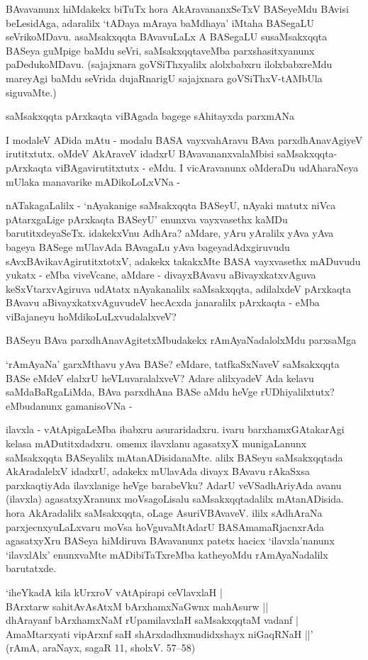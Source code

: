 BAvavanunx hiMdakekx biTuTx hora AkAravananxSeTxV BASeyeMdu BAvisi beLesidAga, adaralilx `tADaya mAraya baMdhaya' iMtaha BASegaLU seVrikoMDavu. asaMsakxqqta BAvavuLaLx A BASegaLU susaMsakxqqta BASeya guMpige baMdu seVri, saMsakxqqtaveMba parxshasitxyanunx paDedukoMDavu. (sajajxnara goVSiThxyalilx alolxbabxru ilolxbabxreMdu mareyAgi baMdu seVrida dujaRnarigU sajajxnara goVSiThxV-tAMbUla siguvaMte.)

saMsakxqqta pArxkaqta viBAgada bagege sAhitayxda parxmANa

I modaleV ADida mAtu - modalu BASA vayxvahAravu BAva parxdhAnavAgiyeV irutitxtutx. oMdeV AkAraveV idadxrU BAvavananxvalaMbisi saMsakxqqta-pArxkaqta viBAgavirutitxtutx - eMdu. I vicAravanunx oMderaDu udAharaNeya mUlaka manavarike mADikoLoLxVNa - 

nATakagaLalilx - `nAyakanige saMsakxqqta BASeyU, nAyaki matutx niVca pAtarxgaLige pArxkaqta BASeyU' enunxva vayxvasethx kaMDu barutitxdeyaSeTx. idakekxVnu AdhAra? aMdare, yAru yAralilx yAva yAva bageya BASege mUlavAda BAvagaLu yAva bageyadAdxgiruvudu sAvxBAvikavAgirutitxtotxV, adakekx takakxMte BASA vayxvasethx mADuvudu yukatx - eMba viveVcane, aMdare - divayxBAvavu aBivayxkatxvAguva keSxVtarxvAgiruva udAtatx nAyakanalilx saMsakxqqta, adilalxdeV pArxkaqta BAvavu aBivayxkatxvAguvudeV hecAcxda janaralilx pArxkaqta - eMba viBajaneyu hoMdikoLuLxvudalalxveV?

BASeyu BAva parxdhAnavAgitetxMbudakekx rAmAyaNadalolxMdu parxsaMga

`rAmAyaNa' garxMthavu yAva BASe? eMdare, tatfkaSxNaveV saMsakxqqta BASe eMdeV elalxrU heVLuvaralalxveV? Adare alilxyadeV Ada kelavu saMdaBaRgaLiMda, BAva parxdhAna BASe aMdu heVge rUDhiyalilxtutx? eMbudanunx gamanisoVNa -

ilavxla - vAtApigaLeMba ibabxru asuraridadxru. ivaru barxhamxGAtakarAgi kelasa mADutitxdadxru. omemx ilavxlanu agasatxyX munigaLanunx saMsakxqqta BASeyalilx mAtanADisidanaMte. alilx BASeyu saMsakxqqtada AkAradalelxV idadxrU, adakekx mUlavAda divayx BAvavu rAkaSxsa parxkaqtiyAda ilavxlanige heVge barabeVku? AdarU veVSadhAriyAda avanu (ilavxla) agasatxyXranunx moVsagoLisalu saMsakxqqtadalilx mAtanADisida. hora AkAradalilx saMsakxqqta, oLage AsuriVBAvaveV. ililx sAdhAraNa parxjecnxyuLaLxvaru moVsa hoVguvaMtAdarU BASAmamaRjacnxrAda agasatxyXru BASeya hiMdiruva BAvavanunx patetx hacicx `ilavxla'nanunx `ilavxlAlx' enunxvaMte mADibiTaTxreMba katheyoMdu rAmAyaNadalilx barutatxde.

\begin{shloka}
`iheYkadA kila kUrxroV vAtApirapi ceVlavxlaH |\\
BArxtarw sahitAvAsAtxM bArxhamxNaGwnx mahAsurw ||\\

dhArayanf bArxhamxNaM rUpamilavxlaH saMsakxqqtaM vadanf |\\
AmaMtarxyati vipArxnf saH shArxdadhxmudidxshayx niGaqRNaH ||'\\
(rAmA, araNayx, sagaR 11, sholxV. 57--58)
\end{shloka}  

